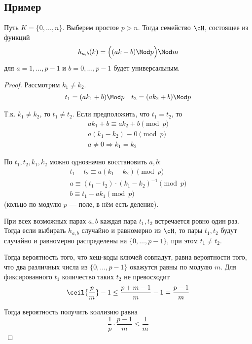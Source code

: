 \subsection{Пример}
\begin{theorem}
    Путь $K = \{0, \ldots, n\}$.
    Выберем простое $p > n$.
    Тогда семейство $\cH$,
    состоящее из функций
    \[ h_{a, b}(k) = \Bigl( (ak + b) \Mod p \Bigr) \Mod m \]
    для $a = 1, \ldots, p - 1$ и $b = 0, \ldots, p - 1$
    будет универсальным.
\end{theorem}
\begin{proof}
    Рассмотрим $k_1 \ne k_2$.
    \begin{align*}
        & t_1 = (ak_1 + b) \Mod p &
        & t_2 = (ak_2 + b) \Mod p \\
    \end{align*}

    Т.к. $k_1 \ne k_2$, то $t_1 \ne t_2$.
    Если предположить, что $t_1 = t_2$,
    то
    \begin{gather*}
        ak_1 + b \equiv ak_2 + b \pmod{p} \\
        a(k_1 - k_2) \equiv 0 \pmod{p} \\
        a \ne 0 \Rightarrow k_1 = k_2
    \end{gather*}

    По $t_1, t_2, k_1, k_2$ можно однозначно восстановить $a, b$:
    \begin{gather*}
        t_1 - t_2 \equiv a(k_1 - k_2) \pmod{p} \\
        a \equiv (t_1 - t_2) \cdot (k_1 - k_2)^{-1} \pmod{p} \\
        b \equiv t_1 - a k_1 \pmod{p}
    \end{gather*}
    (кольцо по модулю $p$ --- поле, в нём есть деление).

    При всех возможных парах $a, b$
    каждая пара $t_1, t_2$ встречается ровно один раз.
    Тогда если выбирать $h_{a, b}$ случайно и равномерно из $\cH$,
    то пары $t_1, t_2$ будут случайно и равномерно
    распределены на $\{0, \ldots, p - 1\}$,
    при этом $t_1 \ne t_2$.

    Тогда вероятность того, что хеш-коды ключей совпадут,
    равна вероятности того, что два различных числа
    из $\{0, \ldots, p - 1\}$ окажутся равны по модулю $m$.
    Для фиксированного $t_1$ количество таких $t_2$ не превосходит
    \[
        \ceil{\frac{p}{m}} - 1
        \le \frac{p + m - 1}{m} - 1
        = \frac{p - 1}{m}
    \]

    Тогда вероятность получить коллизию равна
    \[
        \frac{1}{p} \cdot \frac{p - 1}{m} \le \frac{1}{m}
    \]
\end{proof}

